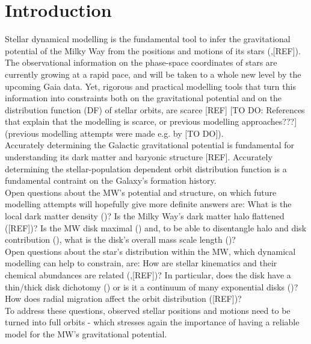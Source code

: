 \section{Introduction} \label{sec:intro}

Stellar dynamical modelling is the fundamental tool to infer the gravitational potential of the Milky Way from the positions and motions of its stars (\cite{rix13},[REF]). The observational information on the phase-space coordinates of stars are currently growing at a rapid pace, and will be taken to a whole new level by the upcoming Gaia data. Yet, rigorous and practical modelling tools that turn this information into constraints both on the gravitational potential and on the distribution function (DF) of stellar orbits, are scarce [REF] [TO DO: References that explain that the modelling is scarce, or previous modelling approaches???] (previous modelling attempts were made e.g. by [TO DO]). \\

Accurately determining the Galactic gravitational potential is fundamental for understanding its dark matter and baryonic structure [REF]. Accurately determining the stellar-population dependent orbit distribution function is a fundamental contraint on the Galaxy's formation history. \\

Open questions about the MW's potential and structure, on which future modelling attempts will hopefully give more definite answers are: What is the local dark matter density (\cite{zha13,bt12})? Is the Milky Way's dark matter halo flattened ([REF])? Is the MW disk maximal (\cite{sac97}) and, to be able to disentangle halo and disk contribution (\cite{deh98}), what is the disk's overall mass scale length (\cite{bov13})?  \\

Open questions about the star's distribution within the MW, which dynamical modelling can help to constrain, are: How are stellar kinematics and their chemical abundances are related (\cite{san15},[REF])? In particular, does the disk have a thin/thick disk dichotomy (\cite{gil83}) or is it a continuum of many exponential disks (\cite{bov12d})? How does radial migration affect the orbit distribution ([REF])?\\
To address these questions, observed stellar positions and motions need to be turned into full orbits - which stresses again the importance of having a reliable model for the MW's gravitational potential. \\

